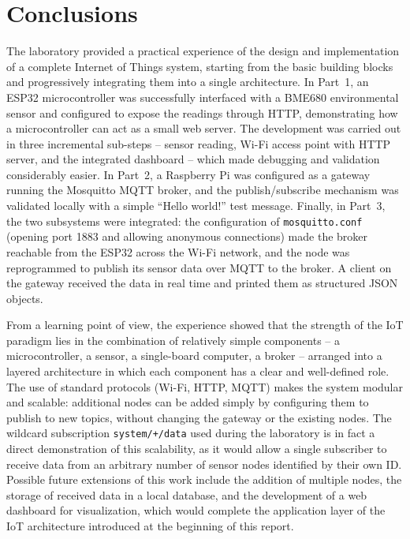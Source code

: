 \documentclass[12pt,a4paper]{report}
\begin{document}
\chapter{Conclusions}
 
The laboratory provided a practical experience of the design and implementation of a complete Internet of Things system, starting from the basic building blocks and progressively integrating them into a single architecture. In Part~1, an ESP32 microcontroller was successfully interfaced with a BME680 environmental sensor and configured to expose the readings through HTTP, demonstrating how a microcontroller can act as a small web server. The development was carried out in three incremental sub-steps -- sensor reading, Wi-Fi access point with HTTP server, and the integrated dashboard -- which made debugging and validation considerably easier. In Part~2, a Raspberry Pi was configured as a gateway running the Mosquitto MQTT broker, and the publish/subscribe mechanism was validated locally with a simple ``Hello world!'' test message. Finally, in Part~3, the two subsystems were integrated: the configuration of \texttt{mosquitto.conf} (opening port 1883 and allowing anonymous connections) made the broker reachable from the ESP32 across the Wi-Fi network, and the node was reprogrammed to publish its sensor data over MQTT to the broker. A client on the gateway received the data in real time and printed them as structured JSON objects.
 
From a learning point of view, the experience showed that the strength of the IoT paradigm lies in the combination of relatively simple components -- a microcontroller, a sensor, a single-board computer, a broker -- arranged into a layered architecture in which each component has a clear and well-defined role. The use of standard protocols (Wi-Fi, HTTP, MQTT) makes the system modular and scalable: additional nodes can be added simply by configuring them to publish to new topics, without changing the gateway or the existing nodes. The wildcard subscription \texttt{system/+/data} used during the laboratory is in fact a direct demonstration of this scalability, as it would allow a single subscriber to receive data from an arbitrary number of sensor nodes identified by their own ID. Possible future extensions of this work include the addition of multiple nodes, the storage of received data in a local database, and the development of a web dashboard for visualization, which would complete the application layer of the IoT architecture introduced at the beginning of this report.
 
\end{document}
